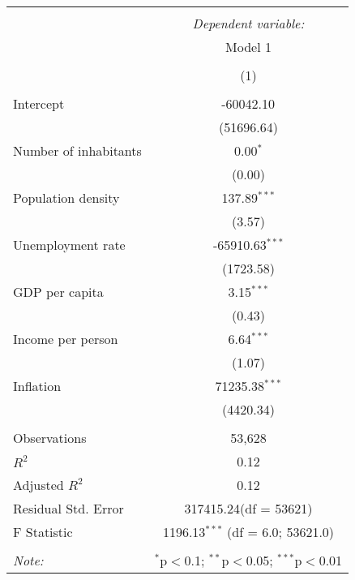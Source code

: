\begin{table}[!htbp] \centering
\begin{tabular}{@{\extracolsep{5pt}}lc}
\\[-1.8ex]\hline
\hline \\[-1.8ex]
& \multicolumn{1}{c}{\textit{Dependent variable:}} \
\cr \cline{1-2}
\\[-1.8ex] & \multicolumn{1}{c}{Model 1} \\\\[-1.8ex] & (1) \\
\hline \\[-1.8ex]
 Intercept & -60042.10$^{}$ \\
  & (51696.64) \\
 Number of inhabitants & 0.00$^{*}$ \\
  & (0.00) \\
 Population density & 137.89$^{***}$ \\
  & (3.57) \\
 Unemployment rate & -65910.63$^{***}$ \\
  & (1723.58) \\
 GDP per capita & 3.15$^{***}$ \\
  & (0.43) \\
 Income per person & 6.64$^{***}$ \\
  & (1.07) \\
 Inflation & 71235.38$^{***}$ \\
  & (4420.34) \\
\hline \\[-1.8ex]
 Observations & 53,628 \\
 $R^2$ & 0.12 \\
 Adjusted $R^2$ & 0.12 \\
 Residual Std. Error & 317415.24(df = 53621)  \\
 F Statistic & 1196.13$^{***}$ (df = 6.0; 53621.0) \\
\hline
\hline \\[-1.8ex]
\textit{Note:} & \multicolumn{1}{r}{$^{*}$p$<$0.1; $^{**}$p$<$0.05; $^{***}$p$<$0.01} \\
\end{tabular}
\end{table}